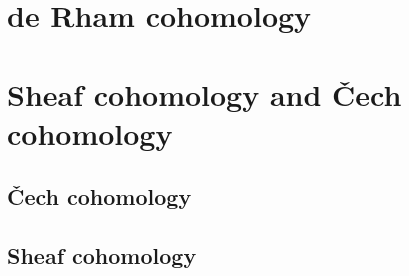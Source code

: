 
















\section{de Rham cohomology}



\section{Sheaf cohomology and \v{C}ech cohomology}

\subsection{\v{C}ech cohomology}



\subsection{Sheaf cohomology}



